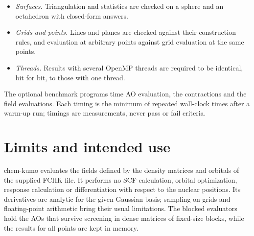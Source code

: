 \documentclass[11pt,a4paper]{article}
\begin{document}
\begin{itemize}
 checked against Gauss--Hermite quadrature, and the overlap also by the
 orthonormality $\mathbf C^{\mathsf T}\mathbf S\mathbf C=\mathbf 1$ of the
 MOs; the grid integrals against constant, affine and quadratic fields,
 trilinear interpolation against linear fields (which it reproduces
 exactly), and the projector against its defining properties
 ($\mathcal P^2=\mathcal P$, $\mathbf B^{\mathsf T}\mathbf S\mathbf B=\mathbf 1$).
\item \emph{Surfaces.} Triangulation and statistics are checked on a
 sphere and an octahedron with closed-form answers.
\item \emph{Grids and points.} Lines and planes are checked against their
 construction rules, and evaluation at arbitrary points against grid
 evaluation at the same points.
\item \emph{Threads.} Results with several OpenMP threads are required to
 be identical, bit for bit, to those with one thread.
\end{itemize}

The optional benchmark programs time AO evaluation, the contractions and
the field evaluations. Each timing is the minimum of repeated wall-clock
times after a warm-up run; timings are measurements, never pass or fail
criteria.

\section{Limits and intended use}
chem-kumo evaluates the fields defined by the density matrices and orbitals
of the supplied FCHK file. It performs no SCF calculation, orbital
optimization, response calculation or differentiation with respect to the
nuclear positions. Its derivatives are analytic for the given Gaussian
basis; sampling on grids and floating-point arithmetic bring their usual
limitations. The blocked evaluators hold the AOs that survive screening in
dense matrices of fixed-size blocks, while the results for all points are
kept in memory.
\end{document}
